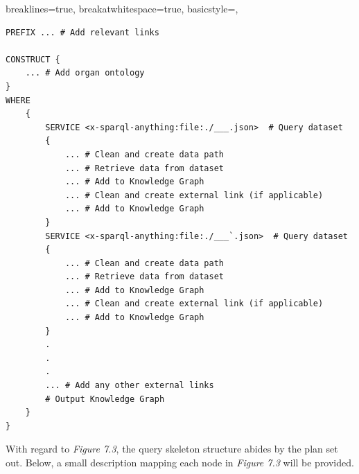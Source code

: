 \lstset
{
    breaklines=true,
    breakatwhitespace=true,
    basicstyle=\linespread{1.25}\ttfamily,
}
\begin{lstlisting} 
PREFIX ... # Add relevant links

CONSTRUCT {
    ... # Add organ ontology
} 
WHERE 
    { 
        SERVICE <x-sparql-anything:file:./___.json>  # Query dataset
        { 
            ... # Clean and create data path
            ... # Retrieve data from dataset
            ... # Add to Knowledge Graph
            ... # Clean and create external link (if applicable)
            ... # Add to Knowledge Graph
        } 
        SERVICE <x-sparql-anything:file:./___`.json>  # Query dataset
        { 
            ... # Clean and create data path
            ... # Retrieve data from dataset
            ... # Add to Knowledge Graph
            ... # Clean and create external link (if applicable)
            ... # Add to Knowledge Graph
        } 
        .
        .
        .
        ... # Add any other external links 
        # Output Knowledge Graph
    }
}
\end{lstlisting}

With regard to \textit{Figure 7.3}, the query skeleton structure abides by the plan set out. Below, a small description mapping each node in \textit{Figure 7.3} will be provided.

